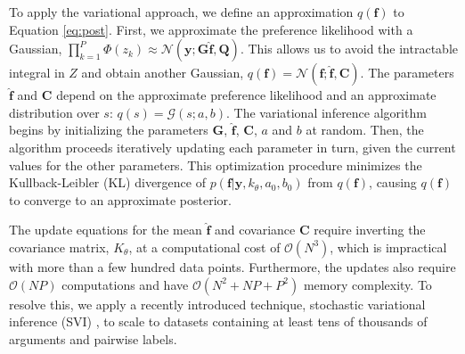To apply the variational approach, we define an approximation $q(\mathbf f)$ to Equation \ref{eq:post}. 
First, we approximate the preference likelihood with a Gaussian, $\prod_{k=1}^P \Phi\left( z_k \right) \approx \mathcal{N}(\mathbf y; \mathbf G\hat{\mathbf f}, \mathbf Q)$. This allows us to avoid the intractable integral in $Z$ and obtain another Gaussian, $q(\mathbf f) = \mathcal{N}(\mathbf f; \hat{\mathbf f}, \mathbf C)$. 
The parameters $\hat{\mathbf f}$ and $\mathbf C$ 
depend on the approximate preference likelihood 
and an approximate distribution over $s$: $q(s) = \mathcal{G}(s; a, b)$. 
The variational inference algorithm begins by initializing the parameters $\mathbf G$, $ \hat{\mathbf f}$, $\mathbf C$, $a$ and $b$ at random. Then, the  algorithm proceeds iteratively updating each parameter in turn, given the current values for the other parameters. 
This optimization procedure minimizes the Kullback-Leibler (KL) divergence of $p(\mathbf f |\mathbf y, k_{\theta}, a_0, b_0)$ from $q(\mathbf f)$, causing $q(\mathbf f)$ to converge to an approximate posterior. 

The update equations for the mean $\hat{\mathbf f}$ and covariance $\mathbf C$ require inverting the covariance matrix, $K_{\theta}$, at a computational cost of $\mathcal{O}(N^3)$, which is impractical with more than a few hundred data points. 
Furthermore, the updates also require $\mathcal{O}(NP)$ computations and
have $\mathcal{O}(N^2 + NP + P^2)$ memory complexity.
To resolve this, 
we apply a recently introduced technique, stochastic variational inference (SVI) 
\cite{hoffman2013stochastic,hensman_scalable_2015},
to scale to datasets containing at least tens of thousands of arguments and pairwise labels.

